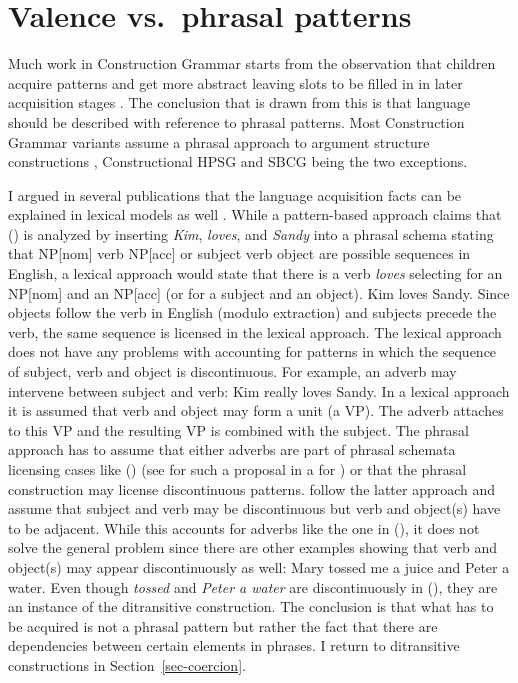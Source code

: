\documentclass[output=paper]{langsci/langscibook}
\begin{document}
\section{Valence vs.\ phrasal patterns}
\label{sec-valence}

Much work in Construction Grammar starts from the observation that children acquire patterns and get
more abstract leaving slots to be filled in in later acquisition stages \citep{Tomasello2003a}. The conclusion that is
drawn from this is that language should be described with reference to phrasal patterns. Most
Construction Grammar variants assume a phrasal approach to argument structure constructions \citep{Goldberg96a,Goldberg2006a,GJ2004a},
Constructional HPSG and SBCG being the two exceptions. 

I argued in several publications that the language acquisition facts can be explained in lexical
models as well \parencites[Section~6.3]{MuellerPersian}[Section~9]{MWArgSt}. While a pattern-based approach claims that () is
analyzed by inserting \emph{Kim}, \emph{loves}, and \emph{Sandy} into a phrasal schema stating that
NP[nom] verb NP[acc] or subject verb object are possible sequences in English, a lexical approach
would state that there is a verb \emph{loves} selecting for an NP[nom] and an NP[acc] (or for a
subject and an object).
\ea
Kim loves Sandy.
\z
Since objects follow the verb in English (modulo extraction) and subjects precede the verb, the same
sequence is licensed in the lexical approach. The lexical approach does not have any problems with
accounting for patterns in which the sequence of subject, verb and object is discontinuous. For
example, an adverb may intervene between subject and verb:
\ea
Kim really loves Sandy.
\z
In a lexical approach it is assumed that verb and object may form a unit (a VP). The adverb attaches
to this VP and the resulting VP is combined with the subject. The phrasal approach has to assume
that either adverbs are part of phrasal schemata licensing cases like () (see
 for such a proposal in a \gpsg for ) or that the phrasal
construction may license discontinuous patterns. \citet[]{BC2005a} follow the latter approach and
assume that subject and verb may be discontinuous but verb and object(s) have to be adjacent. While
this accounts for adverbs like the one in (), it does not solve the general problem since
there are other examples showing that verb and object(s) may appear discontinuously as well:
\ea
Mary tossed me a juice and Peter a water.
\z
Even though \emph{tossed} and \emph{Peter a water} are discontinuously in (), they are an
instance of the ditransitive construction. The conclusion is that what has to be acquired is not a phrasal pattern but rather the fact that
there are dependencies between certain elements in phrases. I return to ditransitive
constructions in Section~\ref{sec-coercion}.%
\end{document}
